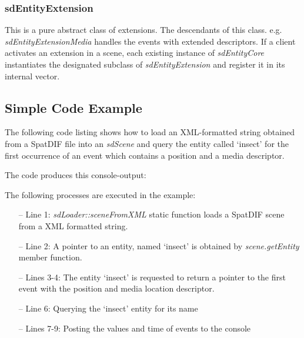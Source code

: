 \documentclass[a4paper]{article}
\begin{document}
\subsubsection{sdEntityExtension}
This is a pure abstract class of extensions. The descendants of this class. e.g. {\it sdEntityExtensionMedia} handles the events with extended descriptors. 
If a client activates an extension in a scene, each existing instance of {\it sdEntityCore} instantiates the designated subclass of {\it sdEntityExtension} and register it in its internal vector.

\subsection{Simple Code Example}
The following code listing shows how to load an XML-formatted string obtained from a SpatDIF file into an {\it sdScene} and query the entity called `insect' for the first occurrence of an event which contains a position and a media descriptor.

\vfill

 


\noindent The code produces this console-output: 
 

\noindent 
The following processes are executed in the example:

\begin{itemize}[leftmargin=*]
\item[--] Line 1: {\it sdLoader::sceneFromXML} static function loads a SpatDIF scene from a XML formatted string.
\item[--] Line 2: A pointer to an entity, named `insect' is obtained by {\it scene.getEntity} member function.
\item[--] Lines 3-4: The entity `insect' is requested to return a pointer to the first event with the position and media location descriptor.
\item[--] Line 6: Querying the `insect' entity for its name
\item[--] Lines 7-9: Posting the values and time of events to the console
\end{itemize}

\end{document}

